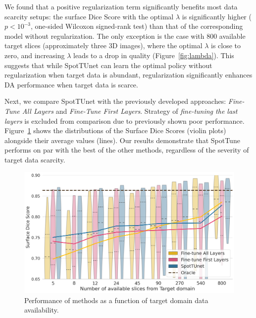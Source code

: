 We found that a positive regularization term significantly benefits most data scarcity setups: the surface Dice Score with the optimal $\lambda$ is significantly higher ($p < 10^{-3}$, one-sided Wilcoxon signed-rank test) than that of the corresponding model without regularization. The only exception is the case with 800 available target slices (approximately three 3D images), where the optimal $\lambda$ is close to zero, and increasing $\lambda$ leads to a drop in quality (Figure~\ref{fig:lambda}). This suggests that while SpotTUnet can learn the optimal policy without regularization when target data is abundant, regularization significantly enhances DA performance when target data is scarce.

Next, we compare SpotTUnet with the previously developed approaches: \textit{Fine-Tune All Layers} and \textit{Fine-Tune First Layers}. Strategy of \textit{fine-tuning the last layers} is excluded from comparison due to previously shown poor performance. Figure~\ref{fig:sdcs} shows the distributions of the Surface Dice Scores (violin plots) alongside their average values (lines). Our results demonstrate that SpotTune performs on par with the best of the other methods, regardless of the severity of target data scarcity.

\begin{figure}[h]
	\centering
	\includegraphics[width=\textwidth]{Dissertation/Figures/2_mri/sdsc.png}
	\caption{Performance of methods as a function of target domain data availability.}
	\label{fig:sdcs}
\end{figure}

